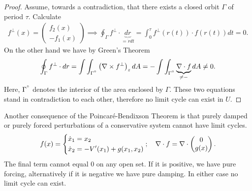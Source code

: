 \begin{proof}
	Assume, towards a contradiction, that there exists a closed orbit $\Gamma$ of period $\tau$. Calculate 
	\begin{align}
	f^{\perp}(x) =
	\begin{pmatrix}
		f_2(x) \\ -f_1(x)
	\end{pmatrix}
	\implies \oint_{\Gamma }f^{\perp}\cdot \underbrace{dr}_{=\dot{r}dt}
	=\int_{0}^{\tau} f^{\perp}(r(t)) \cdot f(r(t)) dt = 0.
	\end{align}
On the other hand we have by Green's Theorem
\begin{align}
	\oint_{\Gamma }f^{\perp}\cdot dr = \int \int_{\Gamma^{\degree}} \left(\nabla \times f^{\perp}\right)_{z}dA = - \int \int_{\Gamma^{\degree}} \underbrace{\nabla \cdot f}_{\neq -}dA \neq 0.
\end{align}
Here, $\Gamma^{\degree}$ denotes the interior of the area enclosed by $\Gamma$. These two equations stand in contradiction to each other, therefore no limit cycle can exist in $U$. 
\end{proof}
\begin{remark}[]
	Another consequence of the Poincaré-Bendixson Theorem is that purely damped or purely forced perturbations of a conservative system cannot have limit cycles. 
	\begin{align}
		f(x) =
		\begin{dcases}
			\dot{x}_1 = x_2 \\
			\dot{x}_2 = -V'(x_1) + g(x_1, x_2)
		\end{dcases}
		;\quad 
		\nabla \cdot f = \nabla \cdot
		\begin{pmatrix}
			0 \\ g(x)
		\end{pmatrix}.
	\end{align}
	The final term cannot equal 0 on any open set. If it is positive, we have pure forcing, alternatively if it is negative we have pure damping. In either case no limit cycle can exist.	
\end{remark}

